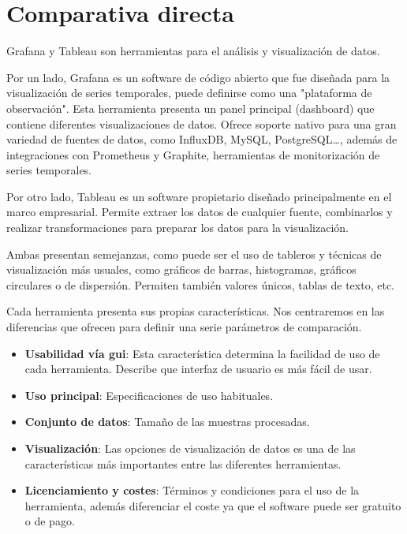 \documentclass[a4paper, 12pt]{book}
\begin{document}
\section{Comparativa directa}
\label{sec:comparativa}

Grafana y Tableau son herramientas para el análisis y visualización de datos. 

Por un lado, Grafana es un software de código abierto que fue diseñada para la visualización de series temporales, puede definirse como una "plataforma de observación". 
Esta herramienta presenta un panel principal (dashboard) que contiene diferentes visualizaciones de datos. Ofrece soporte nativo para una gran variedad de fuentes de datos, como InfluxDB, MySQL, PostgreSQL\ldots, además de integraciones con Prometheus y Graphite, herramientas de monitorización de series temporales. 

Por otro lado, Tableau es un software propietario diseñado principalmente en el marco empresarial. Permite extraer los datos de cualquier fuente, combinarlos y realizar transformaciones para preparar los datos para la visualización. 

Ambas presentan semejanzas, como puede ser el uso de tableros y técnicas de visualización más usuales, como gráficos de barras, histogramas, gráficos circulares o de dispersión. Permiten también valores únicos, tablas de texto, etc.   

Cada herramienta presenta sus propias características. %
Nos centraremos en las diferencias que ofrecen para definir una serie parámetros de comparación. 
\begin{itemize}
    \item \textbf{Usabilidad vía {\gls{gui}}}: Esta característica determina la facilidad de uso de cada herramienta. Describe que interfaz de usuario es más fácil de usar. 
    \item \textbf{Uso principal}: Especificaciones de uso habituales. 
    \item \textbf{Conjunto de datos}: Tamaño de las muestras procesadas.
    \item \textbf{Visualización}: Las opciones de visualización de datos es una de las características más importantes entre las diferentes herramientas. 
    \item \textbf{Licenciamiento y costes}: Términos y condiciones para el uso de la herramienta, además diferenciar el coste ya que el software puede ser gratuito o de pago. 
\end{itemize}
\end{document}

